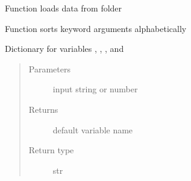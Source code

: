 \documentclass[letterpaper,10pt,english]{sphinxmanual}
\begin{document}

\begin{fulllineitems}
\label{\detokenize{diffsph.utils:diffsph.utils.tools.load_data}}
\sphinxAtStartPar
Function loads data from folder

\end{fulllineitems}


\begin{fulllineitems}
\label{\detokenize{diffsph.utils:diffsph.utils.tools.sort_kwargs}}
\sphinxAtStartPar
Function sorts keyword arguments alphabetically

\end{fulllineitems}


\begin{fulllineitems}
\label{\detokenize{diffsph.utils:diffsph.utils.tools.var_to_str}}
\sphinxAtStartPar
Dictionary for variables , , ,  and 
\begin{quote}\begin{description}
\item[{Parameters}] \leavevmode
\sphinxAtStartPar
{} \textendash{} input string or number

\item[{Returns}] \leavevmode
\sphinxAtStartPar
default variable name

\item[{Return type}] \leavevmode
\sphinxAtStartPar
str

\end{description}\end{quote}

\end{fulllineitems}
\end{document}

